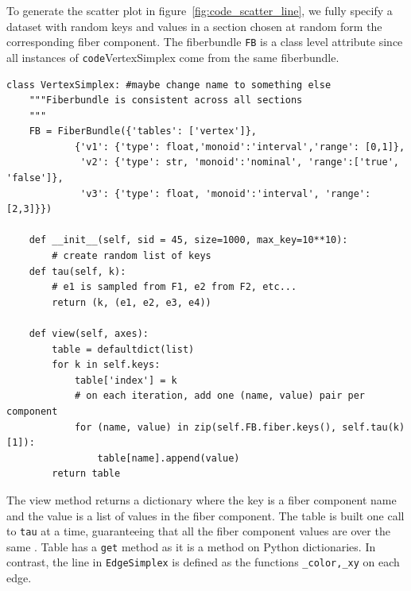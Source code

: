 \documentclass[../main.tex]{subfiles}
\begin{document}
To generate the scatter plot in figure~\ref{fig:code_scatter_line}, we fully specify a dataset with random keys and values in a section chosen at random form the corresponding fiber component. The fiberbundle \texttt{FB} is a class level attribute since all instances of \texttt{code}{VertexSimplex} come from the same fiberbundle.
\begin{verbatim}
class VertexSimplex: #maybe change name to something else
    """Fiberbundle is consistent across all sections
    """
    FB = FiberBundle({'tables': ['vertex']},  
            {'v1': {'type': float,'monoid':'interval','range': [0,1]},
             'v2': {'type': str, 'monoid':'nominal', 'range':['true', 'false']},
             'v3': {'type': float, 'monoid':'interval', 'range':[2,3]}})

    def __init__(self, sid = 45, size=1000, max_key=10**10):
        # create random list of keys
    def tau(self, k):
        # e1 is sampled from F1, e2 from F2, etc...
        return (k, (e1, e2, e3, e4))

    def view(self, axes):
        table = defaultdict(list)
        for k in self.keys:
            table['index'] = k
            # on each iteration, add one (name, value) pair per component
            for (name, value) in zip(self.FB.fiber.keys(), self.tau(k)[1]):
                table[name].append(value)
        return table
\end{verbatim}
The view method returns a dictionary where the key is a fiber component name and the value is a list of values in the fiber component. The table is built one call to \texttt{tau} at a time, guaranteeing that all the fiber component values are over the same \dbasepoint. Table has a \texttt{get} method as it is a method on Python dictionaries. In contrast, the line in \texttt{EdgeSimplex} is defined as the functions \texttt{_color,_xy} on each edge. 
\end{document}
